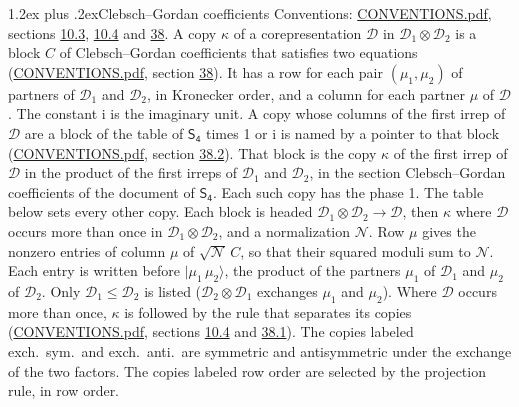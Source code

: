 \documentclass[10pt,a4paper]{article}
\makeatletter
\renewcommand\section{\@startsection{section}{1}{\z@}{-3ex plus -1ex minus -.2ex}%
  {1.2ex plus .2ex}{\normalfont\large\sffamily\bfseries\color{parttitle}}}
\numberwithin{equation}{section}
\newcommand{\grp}[1]{\mathsf{#1}}
\newcommand{\iunit}{\mathrm{i}}
\newcommand{\irrprod}{\otimes}
\newcommand{\mult}{\kappa}
\newcommand{\intx}{\mu}
\newcommand{\cgnorm}{\mathcal{N}}
\newcommand{\prodket}[2]{\lvert {#1}\,{#2}\rangle}
\makeatother
\begin{document}
\section{Clebsch--Gordan coefficients}\label{s:clebsch_gordan}
Conventions: \href{../../CONVENTIONS.pdf}{CONVENTIONS.pdf}, sections \href{../../../rotation/CONVENTIONS.pdf\#conv.10.3}{10.3}, \href{../../../rotation/CONVENTIONS.pdf\#conv.10.4}{10.4} and \href{../../CONVENTIONS.pdf\#conv.38}{38}.
\leavevmode\label{n:index.copy}\label{n:matrix.cg.stored}A copy $\mult$ of a corepresentation $\mathcal{D}$ in $\mathcal{D}_1\irrprod\mathcal{D}_2$ is a block $C$ of Clebsch--Gordan coefficients that satisfies two equations (\href{../../CONVENTIONS.pdf}{CONVENTIONS.pdf}, section \href{../../CONVENTIONS.pdf\#conv.38}{38}). \label{n:index.cg}It has a row for each pair $(\intx_1, \intx_2)$ of partners of $\mathcal{D}_1$ and $\mathcal{D}_2$, in Kronecker order, and a column for each partner $\intx$ of $\mathcal{D}$.
The constant $\iunit$ is the imaginary unit.
A copy whose columns of the first irrep of $\mathcal{D}$ are a block of the table of $\grp{S_{4}}$ times 1 or $\iunit$ is named by a pointer to that block (\href{../../CONVENTIONS.pdf}{CONVENTIONS.pdf}, section \href{../../CONVENTIONS.pdf\#conv.38.2}{38.2}). That block is the copy $\mult$ of the first irrep of $\mathcal{D}$ in the product of the first irreps of $\mathcal{D}_1$ and $\mathcal{D}_2$, in the section Clebsch--Gordan coefficients of the document of \href{../../../rotation/data/pdf/S4.pdf}{$\grp{S_{4}}$}. Each such copy has the phase 1. The table below sets every other copy.
Each block is headed $\mathcal{D}_1\irrprod\mathcal{D}_2\to\mathcal{D}$, then $\mult$ where $\mathcal{D}$ occurs more than once in $\mathcal{D}_1\irrprod\mathcal{D}_2$, and a normalization $\cgnorm$. Row $\intx$ gives the nonzero entries of column $\intx$ of $\sqrt{\cgnorm}\,C$, so that their squared moduli sum to $\cgnorm$. \label{n:vector.ket.product}Each entry is written before $\prodket{\intx_1}{\intx_2}$, the product of the partners $\intx_1$ of $\mathcal{D}_1$ and $\intx_2$ of $\mathcal{D}_2$. Only $\mathcal{D}_1 \le \mathcal{D}_2$ is listed ($\mathcal{D}_2\irrprod\mathcal{D}_1$ exchanges $\intx_1$ and $\intx_2$).
Where $\mathcal{D}$ occurs more than once, $\mult$ is followed by the rule that separates its copies (\href{../../CONVENTIONS.pdf}{CONVENTIONS.pdf}, sections \href{../../../rotation/CONVENTIONS.pdf\#conv.10.4}{10.4} and \href{../../CONVENTIONS.pdf\#conv.38.1}{38.1}). \label{n:abbreviation.exchange}The copies labeled exch.\ sym.\ and exch.\ anti.\ are symmetric and antisymmetric under the exchange of the two factors. The copies labeled row order are selected by the projection rule, in row order.
\end{document}
